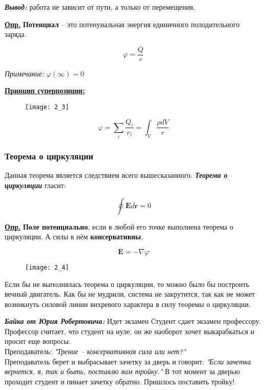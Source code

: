 \textbf{\textit{Вывод:}} работа не зависит от пути, а только от перемещения.

\colorbox{faded}{\underline{\textbf{Опр.}}} \textbf{Потенциал} -- это потенуиальная энергия единичного полодительного заряда. 

\begin{equation}
\varphi = \frac{Q}{r}
\end{equation}

\textit{Примечание:} $\varphi (\infty) = 0$

\colorbox{faded}{\underline{\textbf{Принцип суперпозиции:}}}

\begin{figure}[!ht]
\centering
 \texttt{[image: 2\_3]}     
 \label{fig:my_label}
 \caption{}
\end{figure}

\begin{equation}
\varphi = \sum_{i} \frac{Q_{i}}{r_{i}} = \int_{V} \frac{\rho dV}{r}
\end{equation}

\subsubsection{Теорема о циркуляции}

Данная теорема является следствием всего вышесказанного. \textbf{\textit{Теорема о циркуляции}} гласит:

\begin{equation}
\oint \mathbf{E} d \mathbf{r} = 0
\end{equation}

\colorbox{faded}{\underline{\textbf{Опр.}}} \textbf{Поле потенциально}, если в любой его точке выполнена теорема о циркуляции. А силы в нём \textbf{консервативны}.

\begin{equation}
\mathbf{E} = - \nabla \varphi
\end{equation}

\begin{figure}[!ht]
\centering
 \texttt{[image: 2\_4]}     
 \label{fig:my_label}
 \caption{}
\end{figure}

Если бы не выполнялась теорема о циркуляции, то можно было бы построить вечный двигатель. Как бы не мудрили, система не закрутится, так как не может возникнуть силовой линии вихревого характера в силу теоремы о циркуляции.

\textbf{\textit{Байка от Юрия Робертовича:}} Идет экзамен  Студент сдает экзамен профессору. Профессор считает, что студент на нуле, он же наоборот хочет выкарабкаться и просит еще вопросы.\\
Преподаватель: \textit{"Трение -- консервативная сила или нет?"}\\
Преподаватель берет и выбрасывает зачетку за дверь и говорит: \textit{"Если зачетка вернется, я, так и быть, поставлю вам тройку."} В тот момент за дверью проходит студент и пинает зачетку обратно. Пришлось поставить тройку!

